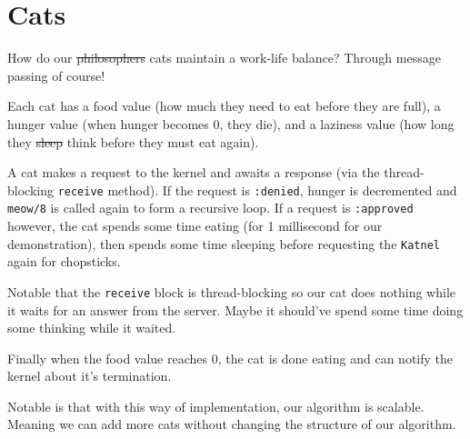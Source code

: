 \section{Cats}
How do our \st{philosophers} cats maintain a work-life balance? Through message passing of course!

Each cat has a food value (how much they need to eat before they are full), a hunger value (when hunger becomes 0, they die), and a laziness value (how long they \st{sleep} think before they must eat again).

A cat makes a request to the kernel and awaits a response (via the thread-blocking \texttt{receive} method). If the request is \texttt{:denied}, hunger is decremented and \texttt{meow/8} is called again to form a recursive loop.
If a request is \texttt{:approved} however, the cat spends some time eating (for 1 millisecond for our demonstration), then spends some time sleeping before requesting the \texttt{Katnel} again for chopsticks.

Notable that the \texttt{receive} block is thread-blocking so our cat does nothing while it waits for an answer from the server. Maybe it should've spend some time doing some thinking while it waited. 

Finally when the food value reaches 0, the cat is done eating and can notify the kernel about it's termination.

\pagebreak


Notable is that with this way of implementation, our algorithm is scalable. Meaning we can add more cats without changing the structure of our algorithm.